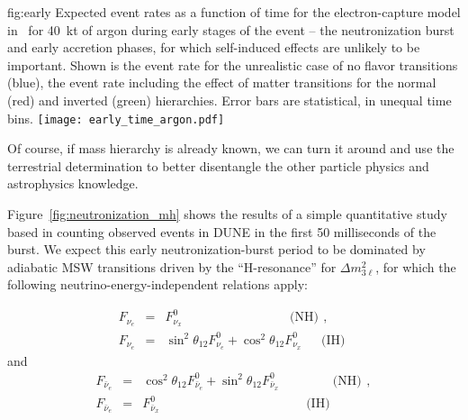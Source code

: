 \begin{dunefigure}{fig:early}
{Expected event rates as a function of time for the electron-capture model in~\cite{Huedepohl:2009wh} for \SI{40}{kt} of argon during early stages of the event -- the neutronization burst and early accretion phases, for which self-induced effects are unlikely to be important.  Shown is the event rate for the unrealistic case of no flavor transitions (blue), the event rate including the effect of matter transitions for the normal (red)  and inverted (green) hierarchies.  Error bars are statistical, in unequal time bins.}
\texttt{[image: early\_time\_argon.pdf]}
\end{dunefigure}

Of course, if mass hierarchy is already known, we can turn it around 
and use the terrestrial determination to better disentangle the other 
particle physics and astrophysics knowledge. 




Figure~\ref{fig:neutronization_mh} shows the results of a simple quantitative study
based in counting observed events in DUNE in the first 50 milliseconds
of the burst.  We expect this early neutronization-burst period to be
dominated by adiabatic MSW transitions driven by the ``H-resonance''
for $\Delta m^2_{3\ell}$, for which the following
neutrino-energy-independent relations apply:

\begin{eqnarray}  
 F_{\nu_e} &=& F^0_{\nu_x} \,\ \,\ \,\ \,\ \,\ \,\ \,\ \,\  \,\ \,\ \,\ \,\   \,\ \,\  \,\ \,\ \,\ \,\ \,\ \,\  \,\ \,\ \textrm{(NH)} \,\ , \label{eq:msw_nmo}\\
 F_{\nu_e} &=&  \sin^2 \theta_{12} F^0_{\nu_e} +
\cos^2 \theta_{12} F^0_{\nu_x}  \,\ \,\ \,\ \,\ \textrm{(IH)} \,\,
\label{eq:msw_imo}
\end{eqnarray} 
 and 
\begin{eqnarray}  
 F_{\bar\nu_e} &=& \cos^2 \theta_{12} F^0_{\bar\nu_e} + \sin^2 \theta_{12} F^0_{\bar\nu_x}   \,\   \,\ \,\  \,\ \,\ \,\ \,\ \,\ \,\  \,\ \,\ \textrm{(NH)} \,\ , \label{eq:msw_nmo_anti}\\
 F_{\bar\nu_e} &=&   F^0_{\bar\nu_x}  \,\ \,\ \,\ \,\ \,\ \,\ \,\ \,\ \,\ \,\ \,\ \,\ \,\ \,\ \,\ \,\ 
 \,\ \,\ \,\ \,\ \,\ \,\ \,\ \,\ \,\ \,\ \,\ \,\ \,\  \,\
\textrm{(IH)} \,\,\label{eq:msw_imo_anti}
\end{eqnarray} 

